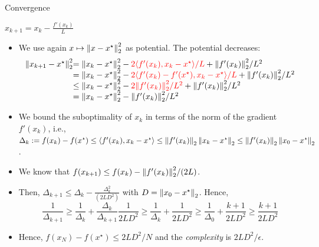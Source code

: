 \documentclass[9pt]{beamer}
\begin{document}
\begin{frame}{Convergence}

  \begin{center}
    \begin{tcolorbox}[width=0.3\textwidth]%
      $x_{k+1} = x_k - \frac {f'(x_k)} {L}$
    \end{tcolorbox}
  \end{center}

  \begin{itemize}
  \item We use again $x\mapsto \left\|x-x^\star\right\|_2^2$ as potential. The potential decreases:
    \[
      \begin{array}{r@{}l}
        \norm{x_{k+1} -x^\star}^2_2 &=\norm{x_k-x^\star}_2^2 - \red{2 \tfrac{\iprod{f'(x_k)}{x_k-x^\star}}{L}} + \tfrac{\norm{f'(x_k)}_2^2}{L^2}\\
                                    &=\norm{x_k-x^\star}_2^2 - \red{2 \tfrac{\iprod{f'(x_k)-f'(x^\star)}{x_k-x^\star}}{L}} + \tfrac{\norm{f'(x_k)}_2^2}{L^2}\\
                                    &\leq \norm{x_k-x^\star}_2^2 - \red{2\tfrac{\norm{f'(x_k)}_2^2}{L^2}} + \tfrac{\norm{f'(x_k)}_2^2}{L^2}\\
                                    &= \norm{x_k-x^\star}_2^2 - \tfrac{\norm{f'(x_k)}_2^2}{L^2}
      \end{array}
    \]
  \item<2->
    We bound the suboptimality of $x_k$ in terms of the norm of the gradient $f'(x_k)$, i.e., $\Delta_k := f(x_k) - f(x^\star) \leq \left<f'(x_k), x_k-x^\star\right> \leq \left\|f'(x_k)\right\|_2 \left\|x_k - x^\star\right\|_2 \leq \left\|f'(x_k)\right\|_2 \left\|x_0-x^\star\right\|_2$.
  \item<3-> We know that $f(x_{k+1}) \leq f(x_k) - {\left\|f'(x_k)\right\|_2^2}/{(2L)}$. 

  \item<4-> Then, $\Delta_{k+1}\leq \Delta_{k} - \tfrac{\Delta_k^2}{(2LD^2)}$ with $D=\left\|x_0-x^\star\right\|_2$. Hence,
    \[
      \frac{1}{\Delta_{k+1}} \geq \frac{1}{\Delta_k} + \frac{\Delta_k}{\Delta_{k+1}} \frac{1}{2LD^2}\geq \frac{1}{\Delta_k} + \frac{1}{2LD^2} \geq \frac{1}{\Delta_0} + \frac{k+1}{2LD^2} \geq \frac{k+1}{2LD^2}
    \]
  \item<5-> Hence, $f(x_N)-f(x^\star)\leq 2 LD^2 / N$ and the \emph{complexity} is $2 LD^2/\epsilon$.
  \end{itemize}
\end{frame}
\end{document}
